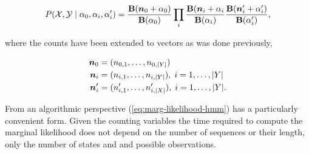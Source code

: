 \documentclass[12pt]{report}
\newcommand{\p}[0]{\prime}
\newcommand{\1}[0]{\mathbbm{1}}
\newcommand{\Bf}[0]{\text{\textbf{B}}}
\DeclarePairedDelimiter\abs{\lvert}{\rvert}%
\begin{document}
\begin{equation}
    P(\mathcal{X}, \mathcal{Y} \mid \alpha_0, \alpha_i, \alpha_i^\prime)
    = \frac{\Bf(\bm{n}_0 + \alpha_0)}{\Bf(\alpha_0)}
    \prod_i \frac{\Bf{(\bm{n}_i + \alpha_i}}{\Bf(\alpha_i)}
    \frac{\Bf(\bm{n}_i^\p + \alpha_i^\p)}{\Bf(\alpha_i^\p)},
    \label{eq:marg-likelihood-hmm}
\end{equation}

where the counts have been extended to vectors as was done previously,

\begin{align*}
    \bm{n}_0 &= (n_{0,1}, \ldots, n_{0,\abs{Y}}) \\
    \bm{n}_i &= (n_{i,1}, \ldots, n_{i,\abs{Y}}),\; i = 1, \ldots, \abs{Y} \\
    \bm{n}_i^\p &= (n_{i,1}^\p, \ldots, n_{i,\abs{X}}^\p),\; i = 1, \ldots, \abs{Y}. \\
\end{align*}

From an algorithmic perspective (\ref{eq:marg-likelihood-hmm}) has a particularly convenient
form. Given the counting variables the time required to compute the marginal likelihood does not
depend on the number of sequences or their length, only the number of states and and possible observations.
\end{document}
